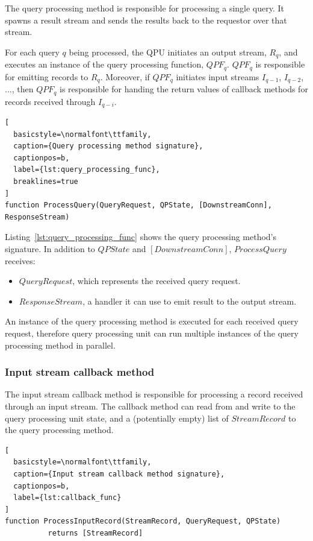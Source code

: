 The query processing method is responsible for processing a single query.
It spawns a result stream and sends the results back to the requestor over that stream.

For each query $q$ being processed, the QPU initiates an output stream, $R_q$,
and executes an instance of the query processing function, $QPF_q$.
$QPF_q$ is responsible for emitting records to $R_q$.
Moreover, if $QPF_q$ initiates input streams $I_{q-1}$, $I_{q-2}$, ..., then $QPF_q$ is responsible for handing the return
values of callback methods for records received through $I_{q-i}$.

\begin{lstlisting}[
  basicstyle=\normalfont\ttfamily,
  caption={Query processing method signature},
  captionpos=b,
  label={lst:query_processing_func},
  breaklines=true
]
function ProcessQuery(QueryRequest, QPState, [DownstreamConn], ResponseStream)
\end{lstlisting}

\noindent
\begin{sloppypar}
Listing~\ref{lst:query_processing_func} shows the query processing method's signature.
In addition to $QPState$ and $[DownstreamConn]$, $ProcessQuery$ receives:
\end{sloppypar}
\begin{itemize}
  \item $QueryRequest$, which represents the received query request.

  \item $ResponseStream$, a handler it can use to emit result to the output stream.

\end{itemize}

An instance of the query processing method is executed for each received query request,
therefore query processing unit can run multiple instances of the query processing method in parallel.

\subsubsection{Input stream callback method}
\label{sec:callback_func}

The input stream callback method is responsible for processing a record received through an input stream.
The callback method can read from and write to the query processing unit state,
and a (potentially empty) list of $StreamRecord$ to the query processing method.

\begin{lstlisting}[
  basicstyle=\normalfont\ttfamily,
  caption={Input stream callback method signature},
  captionpos=b,
  label={lst:callback_func}
]
function ProcessInputRecord(StreamRecord, QueryRequest, QPState)
          returns [StreamRecord]
\end{lstlisting}

